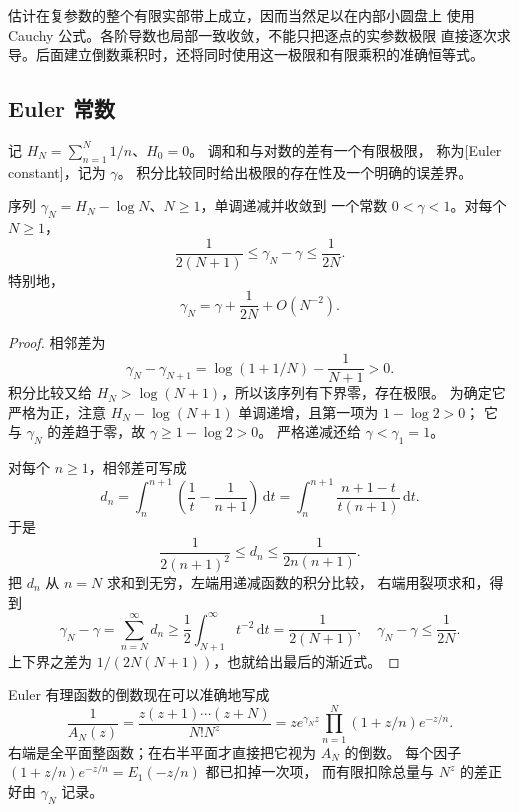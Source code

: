 估计在复参数的整个有限实部带上成立，因而当然足以在内部小圆盘上
使用 Cauchy 公式。各阶导数也局部一致收敛，不能只把逐点的实参数极限
直接逐次求导。后面建立倒数乘积时，还将同时使用这一极限和有限乘积的准确恒等式。

\subsection{Euler 常数}
\label{b3:subsec:210302}

记 \(H_N=\sum_{n=1}^N1/n\)、\(H_0=0\)。
调和和与对数的差有一个有限极限，
称为[Euler constant]，记为 \(\gamma\)。
积分比较同时给出极限的存在性及一个明确的误差界。

\begin{proposition}\label{b3:prop:21-euler-constant}
序列 \(\gamma_N=H_N-\log N\)、\(N\ge1\)，单调递减并收敛到
一个常数 \(0<\gamma<1\)。对每个 \(N\ge1\)，
\[
 \frac1{2(N+1)}\le\gamma_N-\gamma\le\frac1{2N}.
\]
特别地，
\[
 \gamma_N=\gamma+\frac1{2N}+O(N^{-2}).
\]
\end{proposition}
\begin{proof}
相邻差为
\[
 \gamma_N-\gamma_{N+1}
 =\log(1+1/N)-\frac1{N+1}>0.
\]
积分比较又给 \(H_N>\log(N+1)\)，所以该序列有下界零，存在极限。
为确定它严格为正，注意
\(H_N-\log(N+1)\) 单调递增，且第一项为 \(1-\log2>0\)；
它与 \(\gamma_N\) 的差趋于零，故 \(\gamma\ge1-\log2>0\)。
严格递减还给 \(\gamma<\gamma_1=1\)。

对每个 \(n\ge1\)，相邻差可写成
\[
 d_n=\int_n^{n+1}\left(\frac1t-\frac1{n+1}\right)\,\mathrm dt
    =\int_n^{n+1}\frac{n+1-t}{t(n+1)}\,\mathrm dt.
\]
于是
\[
 \frac1{2(n+1)^2}\le d_n\le\frac1{2n(n+1)}.
\]
把 \(d_n\) 从 \(n=N\) 求和到无穷，左端用递减函数的积分比较，
右端用裂项求和，得到
\[
 \gamma_N-\gamma=\sum_{n=N}^\infty d_n
 \ge\frac12\int_{N+1}^\infty t^{-2}\,\mathrm dt
 =\frac1{2(N+1)},\quad
 \gamma_N-\gamma\le\frac1{2N}.
\]
上下界之差为 \(1/(2N(N+1))\)，也就给出最后的渐近式。
\end{proof}

Euler 有理函数的倒数现在可以准确地写成
\begin{equation}\label{b3:eq:21-finite-reciprocal-product}
 \frac1{A_N(z)}
 =\frac{z(z+1)\cdots(z+N)}{N!N^z}
 =z e^{\gamma_Nz}\prod_{n=1}^N(1+z/n)e^{-z/n}.
\end{equation}
右端是全平面整函数；在右半平面才直接把它视为 \(A_N\) 的倒数。
每个因子 \((1+z/n)e^{-z/n}=E_1(-z/n)\) 都已扣掉一次项，
而有限扣除总量与 \(N^z\) 的差正好由 \(\gamma_N\) 记录。

